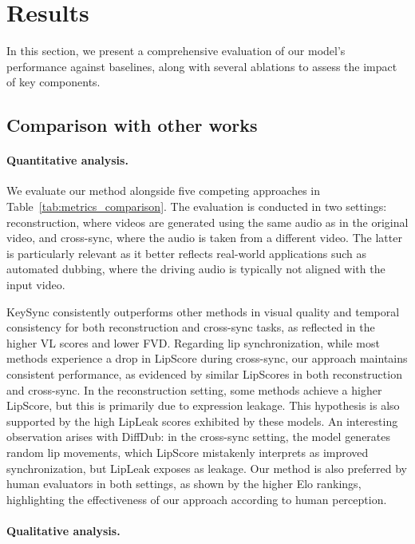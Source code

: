 \section{Results}
\label{sec:results}



In this section, we present a comprehensive evaluation of our model’s performance against baselines, along with several ablations to assess the impact of key components.

\subsection{Comparison with other works} \label{sec:quantitative}
\paragraph{Quantitative analysis.}

We evaluate our method alongside five competing approaches in Table~\ref{tab:metrics_comparison}. The evaluation is conducted in two settings: reconstruction, where videos are generated using the same audio as in the original video, and cross-sync, where the audio is taken from a different video. The latter is particularly relevant as it better reflects real-world applications such as automated dubbing, where the driving audio is typically not aligned with the input video. 

KeySync consistently outperforms other methods in visual quality and temporal consistency for both reconstruction and cross-sync tasks, as reflected in the higher VL scores and lower FVD. Regarding lip synchronization, while most methods experience a drop in LipScore during cross-sync, our approach maintains consistent performance, as evidenced by similar LipScores in both reconstruction and cross-sync. In the reconstruction setting, some methods achieve a higher LipScore, but this is primarily due to expression leakage. This hypothesis is also supported by the high LipLeak scores exhibited by these models. An interesting observation arises with DiffDub: in the cross-sync setting, the model generates random lip movements, which LipScore mistakenly interprets as improved synchronization, but LipLeak exposes as leakage. Our method is also preferred by human evaluators in both settings, as shown by the higher Elo rankings, highlighting the effectiveness of our approach according to human perception.

\paragraph{Qualitative analysis.}

